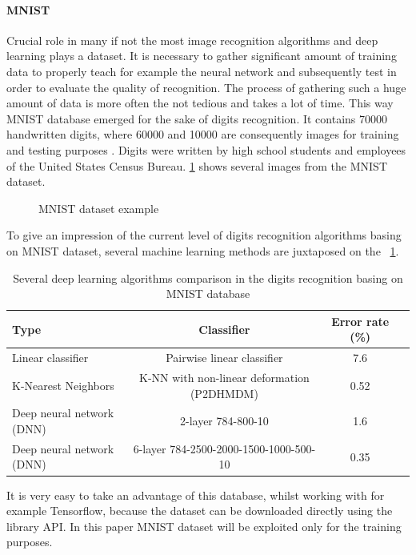 \paragraph{MNIST}
Crucial role in many if not the most image recognition algorithms and deep learning plays a dataset. It is necessary to gather significant amount of training data to properly teach for example the neural network and subsequently test in order to evaluate the quality of recognition. The process of gathering such a huge amount of data is more often the not tedious and takes a lot of time. This way MNIST database emerged for the sake of digits recognition. It contains 70000 handwritten digits, where 60000 and 10000 are consequently images for training and testing purposes \cite{lecun-mnisthandwrittendigit-2010}. Digits were written by high school students and employees of the United States Census Bureau. \figurename{} \ref{fig:mnist_example} shows several images from the MNIST dataset.
\begin{figure}[H]
	\begin{center}
	\end{center}
	\caption{MNIST dataset example}

	\label{fig:mnist_example}
\end{figure}
To give an impression of the current level of digits recognition algorithms basing on MNIST dataset, several machine learning methods are juxtaposed on the \tablename{}~\ref{tab:mnist_comparison}.
\begin{table}[h!]
\centering
\begin{tabular}{    |l|c|c|c|  }
\hline
  Type & Classifier & Error rate (\%)  \\
 \hline
  Linear classifier & Pairwise linear classifier & \num{7.6} \cite{b:Lecun} \\
 \hline
  K-Nearest Neighbors & K-NN with non-linear deformation (P2DHMDM) & \num{0.52} \cite{b:Keysers} \\
 \hline
   Deep neural network (DNN) & 2-layer 784-800-10 & \num{1.6} \cite{b:Simard} \\
 \hline
   Deep neural network (DNN) & 6-layer 784-2500-2000-1500-1000-500-10 & \num{0.35} \cite{b:Cire_an_2010} \\
 \hline
\end{tabular}
 \caption{Several deep learning algorithms comparison in the digits recognition basing on MNIST database}
\label{tab:mnist_comparison}
\end{table}
It is very easy to take an advantage of this database, whilst working with for example Tensorflow, because the dataset can be downloaded directly using the library API. In this paper MNIST dataset will be exploited only for the training purposes.

